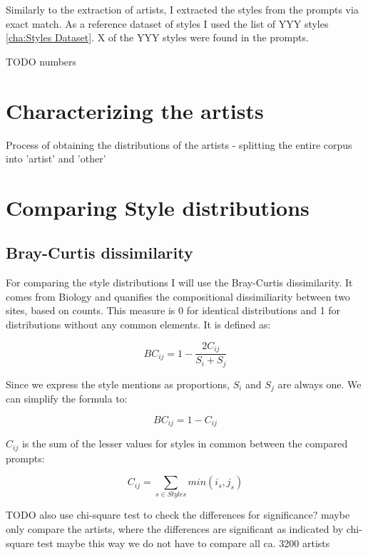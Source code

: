 Similarly to the extraction of artists, I extracted the styles from the prompts via exact match. As a reference dataset of styles I used the list of YYY styles \ref{cha:Styles Dataset}.
X of the YYY styles were found in the prompts.

TODO numbers


\section{Characterizing the artists}

Process of obtaining the distributions of the artists 
- splitting the entire corpus into 'artist' and 'other'

\section{Comparing Style distributions}

\subsection{Bray-Curtis dissimilarity}








For comparing the style distributions I will use the Bray-Curtis dissimilarity. It comes from Biology and quanifies the compositional dissimiliarity between two sites, based on counts. This measure is 0 for identical distributions and 1 for distributions without any common elements. It is defined as:

\[ BC_{ij} = 1 - \frac{2C_{ij}}{S_i + S_j}\]

Since we express the style mentions as proportions, \(S_i\) and \(S_j\) are always one. We can simplify the formula to:

\[ BC_{ij} = 1 - C_{ij} \]


\(C_{ij}\) is the sum of the lesser values for styles in common between the compared prompts:

\[ C_{ij} = \sum_{s \in Styles} min(i_s,j_s)\]



TODO also use chi-square test to check the differences for significance?
maybe only compare the artists, where the differences are significant as indicated by chi-square test
maybe this way we do not have to compare all ca. 3200 artists


